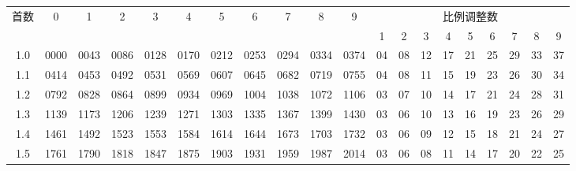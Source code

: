 \documentclass[12pt,UTF8]{ctexbook}
\begin{document}
\begin{appendix}
\begin{longtable}{|c| c c c c c | c c c c c| c c c c c c c c c|}
\toprule
\multirow{2}{*}{首数} & \multirow{2}{*}{0} & \multirow{2}{*}{1} & \multirow{2}{*}{2} & \multirow{2}{*}{3} & \multirow{2}{*}{4} & \multirow{2}{*}{5} & \multirow{2}{*}{6} & \multirow{2}{*}{7} & \multirow{2}{*}{8} & \multirow{2}{*}{9} & \multicolumn{9}{c}{\phantom{啊w}比例调整数\phantom{啊w}} \\
\cline{12-20}
 &  &  &  &  &  &  &  &  &  &  & 1 & 2 & 3 & 4 & 5 & 6 & 7 & 8 & 9 \\
\midrule
\endhead
\scriptsize 1.0 & \scriptsize 0000 & \scriptsize 0043 & \scriptsize 0086 & \scriptsize 0128 & \scriptsize 0170 & \scriptsize 0212 & \scriptsize 0253 & \scriptsize 0294 & \scriptsize 0334 & \scriptsize 0374 & \scriptsize 04 & \scriptsize 08 & \scriptsize 12 & \scriptsize 17 & \scriptsize 21 & \scriptsize 25 & \scriptsize 29 & \scriptsize 33 & \scriptsize 37 \\
\scriptsize 1.1 & \scriptsize 0414 & \scriptsize 0453 & \scriptsize 0492 & \scriptsize 0531 & \scriptsize 0569 & \scriptsize 0607 & \scriptsize 0645 & \scriptsize 0682 & \scriptsize 0719 & \scriptsize 0755 & \scriptsize 04 & \scriptsize 08 & \scriptsize 11 & \scriptsize 15 & \scriptsize 19 & \scriptsize 23 & \scriptsize 26 & \scriptsize 30 & \scriptsize 34 \\
\scriptsize 1.2 & \scriptsize 0792 & \scriptsize 0828 & \scriptsize 0864 & \scriptsize 0899 & \scriptsize 0934 & \scriptsize 0969 & \scriptsize 1004 & \scriptsize 1038 & \scriptsize 1072 & \scriptsize 1106 & \scriptsize 03 & \scriptsize 07 & \scriptsize 10 & \scriptsize 14 & \scriptsize 17 & \scriptsize 21 & \scriptsize 24 & \scriptsize 28 & \scriptsize 31 \\
\scriptsize 1.3 & \scriptsize 1139 & \scriptsize 1173 & \scriptsize 1206 & \scriptsize 1239 & \scriptsize 1271 & \scriptsize 1303 & \scriptsize 1335 & \scriptsize 1367 & \scriptsize 1399 & \scriptsize 1430 & \scriptsize 03 & \scriptsize 06 & \scriptsize 10 & \scriptsize 13 & \scriptsize 16 & \scriptsize 19 & \scriptsize 23 & \scriptsize 26 & \scriptsize 29 \\
\scriptsize 1.4 & \scriptsize 1461 & \scriptsize 1492 & \scriptsize 1523 & \scriptsize 1553 & \scriptsize 1584 & \scriptsize 1614 & \scriptsize 1644 & \scriptsize 1673 & \scriptsize 1703 & \scriptsize 1732 & \scriptsize 03 & \scriptsize 06 & \scriptsize 09 & \scriptsize 12 & \scriptsize 15 & \scriptsize 18 & \scriptsize 21 & \scriptsize 24 & \scriptsize 27 \\
\scriptsize 1.5 & \scriptsize 1761 & \scriptsize 1790 & \scriptsize 1818 & \scriptsize 1847 & \scriptsize 1875 & \scriptsize 1903 & \scriptsize 1931 & \scriptsize 1959 & \scriptsize 1987 & \scriptsize 2014 & \scriptsize 03 & \scriptsize 06 & \scriptsize 08 & \scriptsize 11 & \scriptsize 14 & \scriptsize 17 & \scriptsize 20 & \scriptsize 22 & \scriptsize 25 \\

\end{longtable}
\end{appendix}
\end{document}

